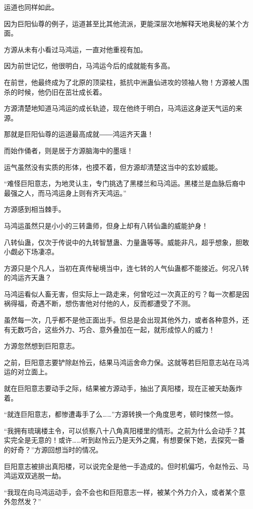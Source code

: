 \begin{this_body}
运道也同样如此。

因为巨阳仙尊的例子，运道甚至比其他流派，更能深层次地解释天地奥秘的某个方面。

方源从未有小看过马鸿运，一直对他重视有加。

因为前世记忆，他很明白，马鸿运今后的成就能有多高。

在前世，他最终成为了北原的顶梁柱，抵抗中洲蛊仙进攻的领袖人物！方源被人围杀的时候，他仍旧在茁壮成长着。

方源清楚地知道马鸿运的成长轨迹，现在他终于明白，马鸿运这身逆天气运的来源。

那就是巨阳仙尊的运道最高成就――鸿运齐天蛊！

而始作俑者，则是居于方源脑海中的墨瑶！

运气虽然没有实质的形体，也摸不着，但方源却清楚这当中的玄妙威能。

“难怪巨阳意志，为地灵认主，专门挑选了黑楼兰和马鸿运。黑楼兰是血脉后裔中最强之人，而马鸿运身上则有齐天鸿运。”

方源感到相当棘手。

马鸿运虽然只是小小的三转蛊师，但身上却有八转仙蛊的威能护身！

八转仙蛊，仅次于传说中的九转智慧蛊、力量蛊等等。威能非凡，超乎想象，胆敢小觑必下场凄凉。

方源只是个凡人，当初在真传秘境当中，连七转的人气仙蛊都不能接近。何况八转的鸿运齐天蛊？

马鸿运看似人畜无害，但实际上一路走来，何曾吃过一次真正的亏？每一次都是因祸得福，奇遇不断，想伤害他对付他的人，反而都遭受了不测。

虽然每一次，几乎都不是他正面出手。但总是会出现其他外力，或者各种意外，还有无数巧合，这些外力、巧合、意外叠加在一起，就形成惊人的威力！

方源忽然想到巨阳意志。

之前，巨阳意志要铲除赵怜云，结果马鸿运舍命力保。这就等若巨阳意志站在马鸿运的对立面上。

就在巨阳意志要动手之际，结果被方源动手，抽出了真阳楼，现在正被天劫轰炸着。

“就连巨阳意志，都惨遭毒手了么……”方源转换一个角度思考，顿时悚然一惊。

“我拥有琉璃楼主令，可以侦察八十八角真阳楼里的情形。之前为什么会动手？其实完全是无意的！或许……听到赵怜云乃是天外之魔，有想要保下她，去探究一番的好奇？”方源回想当时的情况。

巨阳意志被排出真阳楼，可以说完全是他一手造成的。但时机偏巧，令赵怜云、马鸿运双双逃脱一劫。

“我现在向马鸿运动手，会不会也和巨阳意志一样，被某个外力介入，或者某个意外忽然发？”


\end{this_body}

